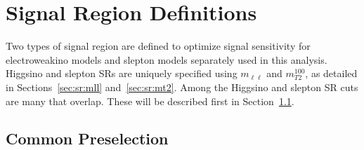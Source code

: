 \section{Signal Region Definitions}
\label{sec:sr:srdef}
 Two types of signal region are defined to optimize signal sensitivity for electroweakino models and slepton models separately used in this analysis. Higgsino and slepton SRs are uniquely specified using $m_{\ell\ell}$ and $m^{100}_{T2}$, as detailed in Sections~\ref{sec:sr:mll} and~\ref{sec:sr:mt2}.  Among the Higgsino and slepton SR cuts are many that overlap.  These will be described first in Section~\ref{sec:sr:commom}.

\subsection{Common Preselection}
\label{sec:sr:commom}

